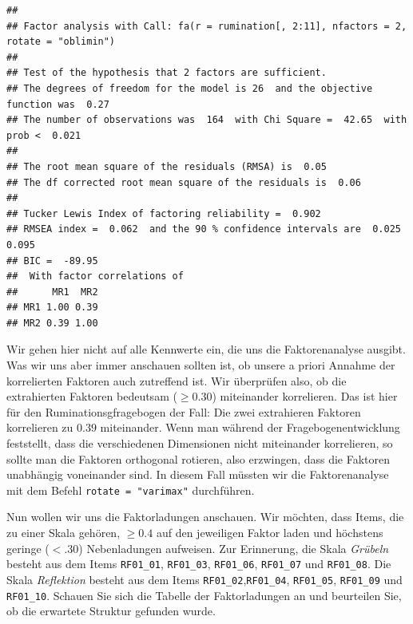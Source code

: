 \documentclass[
  ngerman,
]{book}
\newenvironment{Shaded}{\begin{snugshade}}{\end{snugshade}}
\newcommand{\CommentTok}[1]{\textcolor[rgb]{0.56,0.35,0.01}{\textit{#1}}}
\newcommand{\NormalTok}[1]{#1}
\newcommand{\SpecialCharTok}[1]{\textcolor[rgb]{0.81,0.36,0.00}{\textbf{#1}}}
\begin{document}
\begin{verbatim}
## 
## Factor analysis with Call: fa(r = rumination[, 2:11], nfactors = 2, rotate = "oblimin")
## 
## Test of the hypothesis that 2 factors are sufficient.
## The degrees of freedom for the model is 26  and the objective function was  0.27 
## The number of observations was  164  with Chi Square =  42.65  with prob <  0.021 
## 
## The root mean square of the residuals (RMSA) is  0.05 
## The df corrected root mean square of the residuals is  0.06 
## 
## Tucker Lewis Index of factoring reliability =  0.902
## RMSEA index =  0.062  and the 90 % confidence intervals are  0.025 0.095
## BIC =  -89.95
##  With factor correlations of 
##      MR1  MR2
## MR1 1.00 0.39
## MR2 0.39 1.00
\end{verbatim}

Wir gehen hier nicht auf alle Kennwerte ein, die uns die Faktorenanalyse ausgibt. Was wir uns aber immer anschauen sollten ist, ob unsere a priori Annahme der korrelierten Faktoren auch zutreffend ist. Wir überprüfen also, ob die extrahierten Faktoren bedeutsam (\(\geq 0.30\)) miteinander korrelieren. Das ist hier für den Ruminationsgfragebogen der Fall: Die zwei extrahieren Faktoren korrelieren zu \(0.39\) miteinander. Wenn man während der Fragebogenentwicklung feststellt, dass die verschiedenen Dimensionen nicht miteinander korrelieren, so sollte man die Faktoren orthogonal rotieren, also erzwingen, dass die Faktoren unabhängig voneinander sind. In diesem Fall müssten wir die Faktorenanalyse mit dem Befehl \texttt{rotate\ =\ "varimax"} durchführen.

Nun wollen wir uns die Faktorladungen anschauen. Wir möchten, dass Items, die zu einer Skala gehören, \(\geq 0.4\) auf den jeweiligen Faktor laden und höchstens geringe (\(<.30\)) Nebenladungen aufweisen. Zur Erinnerung, die Skala \emph{Grübeln} besteht aus dem Items \texttt{RF01\_01}, \texttt{RF01\_03}, \texttt{RF01\_06}, \texttt{RF01\_07} und \texttt{RF01\_08}. Die Skala \emph{Reflektion} besteht aus dem Items \texttt{RF01\_02},\texttt{RF01\_04}, \texttt{RF01\_05}, \texttt{RF01\_09} und \texttt{RF01\_10}. Schauen Sie sich die Tabelle der Faktorladungen an und beurteilen Sie, ob die erwartete Struktur gefunden wurde.

\begin{Shaded}
\end{Shaded}
\end{document}
